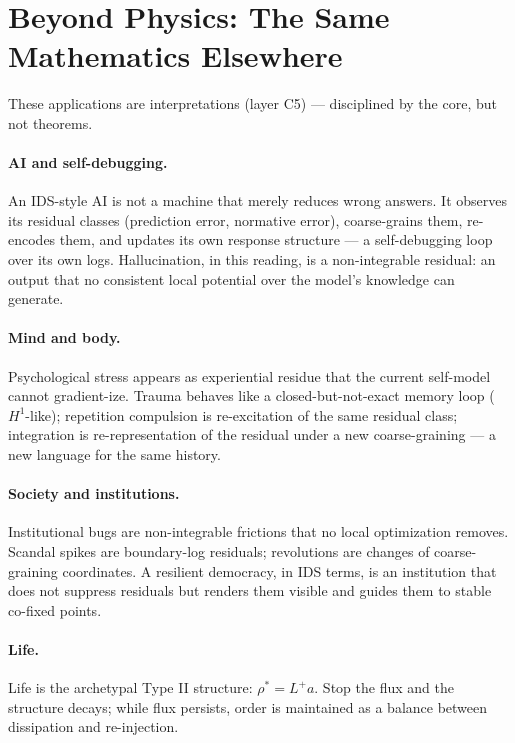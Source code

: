 \documentclass[11pt,a4paper]{article}
\theoremstyle{plain}
\begin{document}
\section{Beyond Physics: The Same Mathematics Elsewhere}\label{sec:beyond}

These applications are interpretations (layer C5) --- disciplined by the core, but not theorems.

\paragraph{AI and self-debugging.}
An IDS-style AI is not a machine that merely reduces wrong answers. It observes its residual classes (prediction error, normative error), coarse-grains them, re-encodes them, and updates its own response structure --- a self-debugging loop over its own logs. Hallucination, in this reading, is a non-integrable residual: an output that no consistent local potential over the model's knowledge can generate.

\paragraph{Mind and body.}
Psychological stress appears as experiential residue that the current self-model cannot gradient-ize. Trauma behaves like a closed-but-not-exact memory loop ($H^1$-like); repetition compulsion is re-excitation of the same residual class; integration is re-representation of the residual under a new coarse-graining --- a new language for the same history.

\paragraph{Society and institutions.}
Institutional bugs are non-integrable frictions that no local optimization removes. Scandal spikes are boundary-log residuals; revolutions are changes of coarse-graining coordinates. A resilient democracy, in IDS terms, is an institution that does not suppress residuals but renders them visible and guides them to stable co-fixed points.

\paragraph{Life.}
Life is the archetypal Type II structure: $\rho^\ast=L^+a$. Stop the flux and the structure decays; while flux persists, order is maintained as a balance between dissipation and re-injection.
\end{document}
